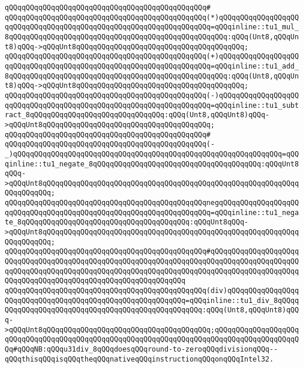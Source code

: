 \verb|qQQqqQQqqQQqqQQqqQQqqQQqqQQqqQQqqQQqqQQqqQQqqQQq#|\newline
\verb|qQQqqQQqqQQqqQQqqQQqqQQqqQQqqQQqqQQqqQQqqQQqqQQq(*)qQQqqQQqqQQqqQQqqQQqqQQqqQQqqQQqqQQqqQQqqQQqqQQqqQQqqQQqqQQqqQQqqQQq=qQQqinline::tu1_mul_8qQQqqQQqqQQqqQQqqQQqqQQqqQQqqQQqqQQqqQQqqQQqqQQqqQQq:qQQq(Unt8,qQQqUnt8)qQQq->qQQqUnt8qQQqqQQqqQQqqQQqqQQqqQQqqQQqqQQqqQQqqQQq;|\newline
\verb|qQQqqQQqqQQqqQQqqQQqqQQqqQQqqQQqqQQqqQQqqQQqqQQq(+)qQQqqQQqqQQqqQQqqQQqqQQqqQQqqQQqqQQqqQQqqQQqqQQqqQQqqQQqqQQqqQQqqQQq=qQQqinline::tu1_add_8qQQqqQQqqQQqqQQqqQQqqQQqqQQqqQQqqQQqqQQqqQQqqQQqqQQq:qQQq(Unt8,qQQqUnt8)qQQq->qQQqUnt8qQQqqQQqqQQqqQQqqQQqqQQqqQQqqQQqqQQqqQQq;|\newline
\verb|qQQqqQQqqQQqqQQqqQQqqQQqqQQqqQQqqQQqqQQqqQQqqQQq(-)qQQqqQQqqQQqqQQqqQQqqQQqqQQqqQQqqQQqqQQqqQQqqQQqqQQqqQQqqQQqqQQqqQQq=qQQqinline::tu1_subtract_8qQQqqQQqqQQqqQQqqQQqqQQqqQQqqQQq:qQQq(Unt8,qQQqUnt8)qQQq->qQQqUnt8qQQqqQQqqQQqqQQqqQQqqQQqqQQqqQQqqQQqqQQq;|\newline
\verb|qQQqqQQqqQQqqQQqqQQqqQQqqQQqqQQqqQQqqQQqqQQqqQQq#|\newline
\verb|qQQqqQQqqQQqqQQqqQQqqQQqqQQqqQQqqQQqqQQqqQQqqQQq(-_)qQQqqQQqqQQqqQQqqQQqqQQqqQQqqQQqqQQqqQQqqQQqqQQqqQQqqQQqqQQqqQQq=qQQqinline::tu1_negate_8qQQqqQQqqQQqqQQqqQQqqQQqqQQqqQQqqQQqqQQq:qQQqUnt8qQQq->qQQqUnt8qQQqqQQqqQQqqQQqqQQqqQQqqQQqqQQqqQQqqQQqqQQqqQQqqQQqqQQqqQQqqQQqqQQqqQQq;|\newline
\verb|qQQqqQQqqQQqqQQqqQQqqQQqqQQqqQQqqQQqqQQqqQQqqQQqnegqQQqqQQqqQQqqQQqqQQqqQQqqQQqqQQqqQQqqQQqqQQqqQQqqQQqqQQqqQQqqQQqqQQq=qQQqinline::tu1_negate_8qQQqqQQqqQQqqQQqqQQqqQQqqQQqqQQqqQQqqQQq:qQQqUnt8qQQq->qQQqUnt8qQQqqQQqqQQqqQQqqQQqqQQqqQQqqQQqqQQqqQQqqQQqqQQqqQQqqQQqqQQqqQQqqQQqqQQq;|\newline
\verb|qQQqqQQqqQQqqQQqqQQqqQQqqQQqqQQqqQQqqQQqqQQqqQQq#qQQqqQQqqQQqqQQqqQQqqQQqqQQqqQQqqQQqqQQqqQQqqQQqqQQqqQQqqQQqqQQqqQQqqQQqqQQqqQQqqQQqqQQqqQQqqQQqqQQqqQQqqQQqqQQqqQQqqQQqqQQqqQQqqQQqqQQqqQQqqQQqqQQqqQQqqQQqqQQqqQQqqQQqqQQqqQQqqQQqqQQqqQQqqQQqqQQqqQQqqQQq|\newline
\verb|qQQqqQQqqQQqqQQqqQQqqQQqqQQqqQQqqQQqqQQqqQQqqQQq(div)qQQqqQQqqQQqqQQqqQQqqQQqqQQqqQQqqQQqqQQqqQQqqQQqqQQqqQQqqQQq=qQQqinline::tu1_div_8qQQqqQQqqQQqqQQqqQQqqQQqqQQqqQQqqQQqqQQqqQQqqQQqqQQq:qQQq(Unt8,qQQqUnt8)qQQq->qQQqUnt8qQQqqQQqqQQqqQQqqQQqqQQqqQQqqQQqqQQqqQQq;qQQqqQQqqQQqqQQqqQQqqQQqqQQqqQQqqQQqqQQqqQQqqQQqqQQqqQQqqQQqqQQqqQQqqQQqqQQqqQQqqQQqqQQqqQQq#qQQqNB:qQQqu31div_8qQQqdoesqQQqround-to-zeroqQQqdivisionqQQq--qQQqthisqQQqisqQQqtheqQQqnativeqQQqinstructionqQQqonqQQqIntel32.|\newline
